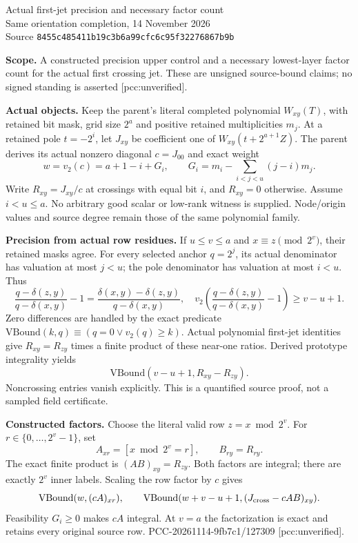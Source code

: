\documentclass[10pt]{article}
\begin{document}
\begin{center}
{\Large Actual first-jet precision and necessary factor count}\\[4pt]
Same orientation completion, 14 November 2026\\
Source \texttt{8455c485411b19c3b6a99cfc6c95f32276867b9b}
\end{center}
\textbf{Scope.} A constructed precision upper control and a necessary
lowest-layer factor count for the actual first crossing jet. These are
unsigned source-bound claims; no signed standing is asserted [pcc:unverified].

\textbf{Actual objects.} Keep the parent's literal completed polynomial
$W_{xy}(T)$, with retained bit mask, grid size $2^a$ and positive retained
multiplicities $m_j$. At a retained pole $t=-2^i$, let $J_{xy}$ be coefficient
one of $W_{xy}(t+2^{a+1}Z)$. The parent derives its actual nonzero diagonal
$c=J_{00}$ and exact weight
\[
 w=v_2(c)=a+1-i+G_i,\qquad
 G_i=m_i-\sum_{i<j<u}(j-i)m_j.
\]
Write $R_{xy}=J_{xy}/c$ at crossings with equal bit $i$, and $R_{xy}=0$
otherwise. Assume $i<u\le a$. No arbitrary good scalar or low-rank witness
is supplied. Node/origin values and source degree remain those of the same
polynomial family.

\textbf{Precision from actual row residues.} If $u\le v\le a$ and
$x\equiv z\pmod{2^v}$, their retained masks agree. For every selected anchor
$q=2^j$, its actual denominator has valuation at most $j<u$; the pole
denominator has valuation at most $i<u$. Thus
\[
 \frac{q-\delta(z,y)}{q-\delta(x,y)}-1
 =\frac{\delta(x,y)-\delta(z,y)}{q-\delta(x,y)},
 \quad
 v_2\left(\frac{q-\delta(z,y)}{q-\delta(x,y)}-1\right)\ge v-u+1.
\]
Zero differences are handled by the exact predicate
$\mathrm{VBound}(k,q)\equiv(q=0\lor v_2(q)\ge k)$.
Actual polynomial first-jet identities give $R_{xy}=R_{zy}$ times a finite
product of these near-one ratios. Derived prototype integrality yields
\[
 \mathrm{VBound}(v-u+1,R_{xy}-R_{zy}).
\]
Noncrossing entries vanish explicitly. This is a quantified source proof,
not a sampled field certificate.

\textbf{Constructed factors.} Choose the literal valid row $z=x\bmod2^v$.
For $r\in\{0,\ldots,2^v-1\}$, set
\[
 A_{xr}=[x\bmod2^v=r],\qquad B_{ry}=R_{ry}.
\]
The exact finite product is $(AB)_{xy}=R_{zy}$. Both factors are integral;
there are exactly $2^v$ inner labels. Scaling the row factor by $c$ gives
\[
 \mathrm{VBound}(w,(cA)_{xr}),\qquad
 \mathrm{VBound}(w+v-u+1,(J_{\rm cross}-cAB)_{xy}).
\]
Feasibility $G_i\ge0$ makes $cA$ integral. At $v=a$ the factorization is
exact and retains every original source row.
PCC-20261114-9fb7c1/127309 [pcc:unverified].
\end{document}
